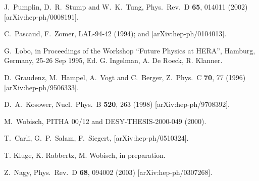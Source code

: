 \begin{thebibliography}{19}
  J.~Pumplin, D.~R.~Stump and W.~K.~Tung,
  Phys.\ Rev.\ D {\bf 65}, 014011 (2002)
  [arXiv:hep-ph/0008191].

  C.~Pascaud, F.~Zomer,
   LAL-94-42 (1994);
   and
          [arXiv:hep-ph/0104013].


  G.~Lobo,
   in Proceedings of the Workshop ``Future Physics at HERA'', 
   Hamburg, Germany, 25-26 Sep 1995,
   Ed. G. Ingelman, A. De Roeck, R. Klanner.

  D.~Graudenz, M.~Hampel, A.~Vogt and C.~Berger,
  Z.\ Phys.\ C {\bf 70}, 77 (1996)
  [arXiv:hep-ph/9506333].



  D.~A.~Kosower,
  Nucl.\ Phys.\ B {\bf 520}, 263 (1998)
  [arXiv:hep-ph/9708392].

  M.~Wobisch,
   PITHA 00/12 and
  DESY-THESIS-2000-049 (2000).


  T.~Carli, G.~P.~Salam, F.~Siegert,
  [arXiv:hep-ph/0510324].

T. Kluge, K. Rabbertz, M. Wobisch, in preparation.


  Z.~Nagy,
  Phys.\ Rev.\ D {\bf 68}, 094002 (2003)
  [arXiv:hep-ph/0307268].


\end{thebibliography}
